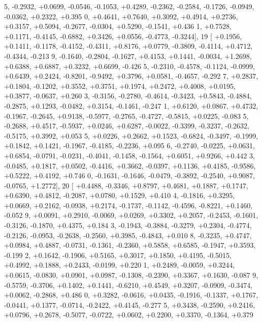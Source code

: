 \begin{DoxyCode}
      5, -0.2932, +0.0699, -0.0546, -0.1053, +0.4289, -0.2362, -0.2584, -0.1726, -0.0949, -0.0362, +0.2322, +0.395
      0, +0.4641, +0.7640, +0.3092, +0.4914, +0.2736, +0.3157, +0.5094, -0.2677, -0.0304, +0.5290, -0.1541, +0.436
      1, +0.7528, +0.1171, -0.4145, -0.6882, +0.3426, +0.0556, -0.4773, -0.3244],
19 [ +0.1956, +0.1411, -0.1178, -0.4152, -0.4311, +0.8176, +0.0779, -0.3809, -0.4114, +0.4712, -0.4344, -0.213
      9, -0.1640, -0.2804, -0.1627, +0.4153, +0.1441, -0.0034, +1.2698, +0.6388, +0.6887, +0.3232, +0.6699, -0.426
      5, -0.2310, -0.4578, -0.1124, -0.0999, +0.6439, +0.2424, -0.8201, -0.9492, +0.3796, +0.0581, -0.4657, -0.292
      7, +0.2837, +0.1804, -0.1202, +0.3552, +0.3751, +0.1974, +0.2472, +0.4008, +0.0195, +0.3877, -0.0637, +0.260
      3, -0.3156, -0.2780, -0.4614, -0.3423, +0.5843, -0.4884, -0.2875, +0.1293, -0.0482, +0.3154, -0.1461, -0.247
      1, +0.6120, +0.0867, +0.4732, -0.1967, -0.2645, +0.9138, -0.5977, -0.2765, -0.4727, -0.5815, +0.0225, -0.083
      5, -0.2688, +0.4517, -0.5937, +0.0246, +0.6287, -0.0022, -0.3399, -0.3237, -0.2632, -0.5175, +0.3992, +0.053
      5, +0.0226, +0.2662, +0.1523, -0.6824, -0.3497, -0.1999, +0.1842, +0.1421, -0.1967, -0.4185, -0.2236, +0.095
      6, -0.2740, -0.0225, +0.0631, +0.6854, -0.0791, -0.0231, -0.4041, -0.1458, -0.1564, +0.6051, +0.9266, +0.442
      3, -0.0485, +0.1817, +0.0502, -0.4416, +0.3662, -0.0397, +0.1136, +0.4185, -0.9586, +0.5222, +0.4192, +0.746
      0, -0.1631, -0.1646, -0.0479, -0.3892, -0.2540, +0.9087, -0.0765, +1.2772],
20 [ +0.4488, -0.3346, +0.8797, +0.4681, +0.1887, +0.1747, +0.6390, +0.4812, -0.2087, +0.0780, +0.1529, +0.410
      4, -0.1816, +0.3295, +0.0669, +0.2162, -0.0938, +0.2174, -0.1737, -0.1142, -0.4596, -0.8221, +0.1460, -0.052
      9, +0.0091, +0.2910, -0.0069, +0.0269, +0.3302, +0.2057, -0.2453, -0.1601, -0.3126, -0.1870, +0.4375, +0.184
      3, -0.1943, -0.3884, -0.3279, +0.2304, -0.4774, -0.2126, -0.0953, -0.2638, -0.2560, +0.3985, -0.4843, +0.010
      8, -0.3235, +0.4747, +0.0984, +0.4887, -0.0731, -0.1361, -0.2360, +0.5858, +0.6585, -0.1947, +0.3593, -0.199
      2, +0.1642, -0.1906, +0.5165, +0.3017, +0.1850, +0.4195, -0.5015, +0.4992, +0.1888, +0.2433, -0.0199, +0.220
      1, +0.2489, -0.0059, +0.3244, +0.0615, -0.0830, +0.0901, +0.0987, -0.1308, -0.2390, +0.3367, +0.1630, -0.087
      9, -0.5759, -0.3706, +0.1402, +0.1441, -0.6210, +0.4549, +0.3207, -0.0909, -0.3474, +0.0062, -0.2868, +0.486
      0, +0.3282, -0.0616, +0.0435, -0.1916, -0.1337, +0.1767, -0.0441, +0.1377, -0.0714, -0.2422, +0.4145, -0.277
      5, +0.3438, -0.2590, +0.2416, +0.0796, +0.2678, -0.5077, -0.0722, +0.0602, +0.2200, +0.3370, -0.1364, +0.379

\end{DoxyCode}
